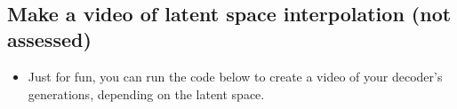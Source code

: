 \documentclass[11pt]{article}
\providecommand{\tightlist}{%
      \setlength{\itemsep}{0pt}\setlength{\parskip}{0pt}}
\newcommand{\prompt}[4]{
        \llap{{\color{#2}[#3]: #4}}\vspace{-1.25em}
    }
\begin{document}
    \begin{center}
    \end{center}
    { \hspace*{\fill} \\}
    
    \begin{tcolorbox}[breakable, size=fbox, boxrule=1pt, pad at break*=1mm,colback=cellbackground, colframe=cellborder]
\prompt{In}{incolor}{ }{\hspace{4pt}}
\begin{Verbatim}[commandchars=\\\{\}]

\end{Verbatim}
\end{tcolorbox}

    \begin{tcolorbox}[breakable, size=fbox, boxrule=1pt, pad at break*=1mm,colback=cellbackground, colframe=cellborder]
\prompt{In}{incolor}{ }{\hspace{4pt}}
\begin{Verbatim}[commandchars=\\\{\}]

\end{Verbatim}
\end{tcolorbox}

    \subsection{Make a video of latent space interpolation (not
assessed)}\label{make-a-video-of-latent-space-interpolation-not-assessed}

\begin{itemize}
\tightlist
\item
  Just for fun, you can run the code below to create a video of your
  decoder's generations, depending on the latent space.
\end{itemize}
\end{document}
